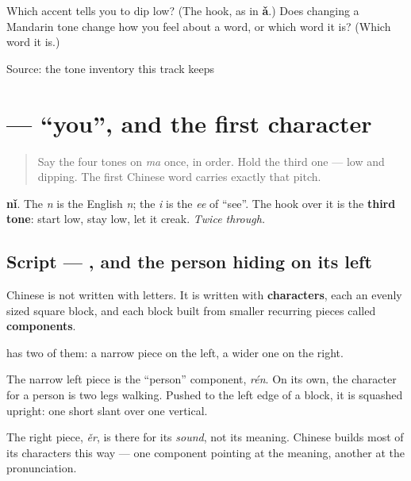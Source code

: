 \begin{tcolorbox}[breakable,colback=teal!4,colframe=teal!35!black,title={Before you move on}]
Which accent tells you to dip low? (The hook, as in \textbf{ǎ}.) Does changing a Mandarin tone change how you feel about a word, or which word it is? (Which word it is.)

Source: the tone inventory this track keeps
\end{tcolorbox}
\section[\texorpdfstring{\zh{你} (nǐ)}{你 (nǐ)}]{ — \textquotedblleft{}you\textquotedblright{}, and the first character}

\label{lesson:ZH-C01-ni}



\begin{quote}
Say the four tones on \emph{ma} once, in order. Hold the third one — low and dipping. The first Chinese word carries exactly that pitch.
\end{quote}

\begin{sounds}
\textbf{nǐ}. The \emph{n} is the English \emph{n}; the \emph{i} is the \emph{ee} of \textquotedblleft{}see\textquotedblright{}. The hook over it is the \textbf{third tone}: start low, stay low, let it creak. \emph{Twice through.}
\end{sounds}

\subsection*{Script — , and the person hiding on its left}
Chinese is not written with letters. It is written with \textbf{characters}, each an evenly sized square block, and each block built from smaller recurring pieces called \textbf{components}.

\textbf{} has two of them: a narrow piece on the left, a wider one on the right.

The narrow left piece is the \textquotedblleft{}person\textquotedblright{} component, \emph{rén}. On its own, the character for a person is two legs walking. Pushed to the left edge of a block, it is squashed upright: one short slant over one vertical.

The right piece, \emph{ěr}, is there for its \emph{sound}, not its meaning. Chinese builds most of its characters this way — one component pointing at the meaning, another at the pronunciation.


